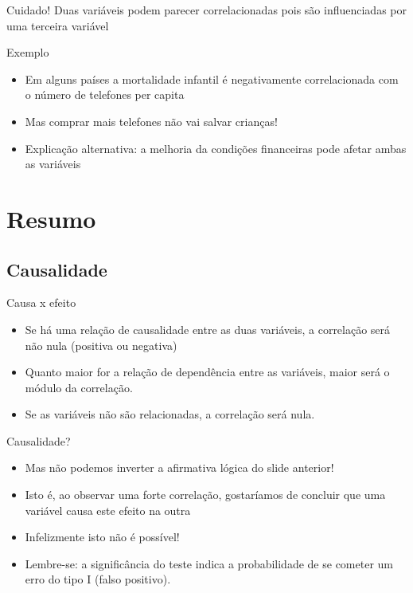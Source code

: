 \documentclass{beamer}
\begin{document}
\begin{frame}{\scriptsize }
  \begin{block}{Cuidado!}
    \footnotesize
    Duas variáveis podem \alert{parecer} correlacionadas pois são
    influenciadas por uma terceira variável
  \end{block}
  \begin{exampleblock}{Exemplo}
    \footnotesize
    \begin{itemize}
      \footnotesize
    \item Em alguns países a mortalidade infantil é negativamente
      correlacionada com o número de telefones per capita
    \item Mas comprar mais telefones não vai salvar crianças!
      \bigskip
    \item Explicação alternativa: a melhoria da condições financeiras
      pode afetar ambas as variáveis
    \end{itemize}    
  \end{exampleblock}
\end{frame}

\section{Resumo}

\subsection{Causalidade}

\begin{frame}{\scriptsize Causa x efeito}
  \begin{itemize}
    \footnotesize
  \item Se há uma relação de causalidade entre as duas variáveis, a
    correlação será não nula (positiva ou negativa)
    \bigskip
  \item Quanto maior for a relação de dependência entre as variáveis,
    maior será o módulo da correlação.
    \bigskip
  \item Se as variáveis não são relacionadas, a correlação será nula.
  \end{itemize}
\end{frame}

\begin{frame}{\scriptsize Causalidade?}
  \begin{itemize}
    \footnotesize
  \item Mas não podemos inverter a afirmativa lógica do slide
    anterior!
    \bigskip
  \item Isto é, ao observar uma forte correlação, gostaríamos de
    concluir que uma variável \alert{causa} este efeito na outra
    \bigskip
  \item Infelizmente isto não é possível!
    \bigskip
  \item Lembre-se: a significância do teste indica a probabilidade de
    se cometer um erro do tipo I (falso positivo).
  \end{itemize}
\end{frame}
\end{document}
